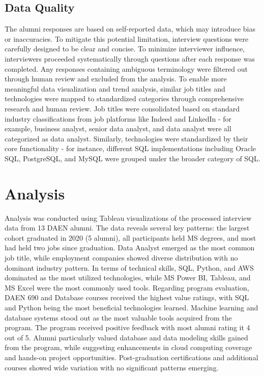 \documentclass[12pt,a4paper]{article}
\begin{document}
\subsection{Data Quality}
The alumni responses are based on self-reported data, which may introduce bias or inaccuracies. To mitigate this potential limitation, interview questions were carefully designed to be clear and concise. To minimize interviewer influence, interviewers proceeded systematically through questions after each response was completed. Any responses containing ambiguous terminology were filtered out through human review and excluded from the analysis. To enable more meaningful data visualization and trend analysis, similar job titles and technologies were mapped to standardized categories through comprehensive research and human review. Job titles were consolidated based on standard industry classifications from job platforms like Indeed and LinkedIn - for example, business analyst, senior data analyst, and data analyst were all categorized as data analyst. Similarly, technologies were standardized by their core functionality - for instance, different SQL implementations including Oracle SQL, PostgreSQL, and MySQL were grouped under the broader category of SQL.

\section{Analysis}
Analysis was conducted using Tableau visualizations of the processed interview data from 13 DAEN alumni. The data reveals several key patterns: the largest cohort graduated in 2020 (5 alumni), all participants held MS degrees, and most had held two jobs since graduation. Data Analyst emerged as the most common job title, while employment companies showed diverse distribution with no dominant industry pattern. In terms of technical skills, SQL, Python, and AWS dominated as the most utilized technologies, while MS Power BI, Tableau, and MS Excel were the most commonly used tools. Regarding program evaluation, DAEN 690 and Database courses received the highest value ratings, with SQL and Python being the most beneficial technologies learned. Machine learning and database systems stood out as the most valuable tools acquired from the program. The program received positive feedback with most alumni rating it 4 out of 5. Alumni particularly valued database and data modeling skills gained from the program, while suggesting enhancements in cloud computing coverage and hands-on project opportunities. Post-graduation certifications and additional courses showed wide variation with no significant patterns emerging.
\end{document}
